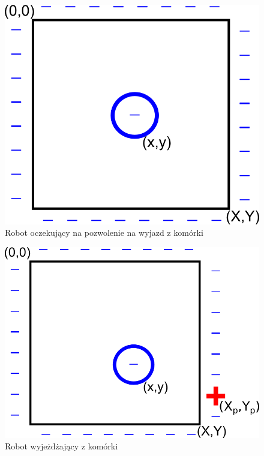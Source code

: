 	
	\begin{figure}[H]
		\centering
		\includegraphics[scale=0.9]{img/waiting.png}
		\caption{Robot oczekujący na pozwolenie na wyjazd z komórki}
		\label{pic:waiting}
	\end{figure}
	\begin{figure}[H]
		\centering
		\includegraphics[scale=0.9]{img/moving.png}
		\caption{Robot wyjeżdżający z komórki}
		\label{pic:moving}
	\end{figure}
